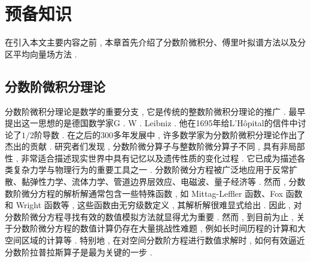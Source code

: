 \chapter[预备知识]{预备知识}

在引入本文主要内容之前 , 本章首先介绍了分数阶微积分、傅里叶拟谱方法以及分区平均向量场方法 . 
\section{分数阶微积分理论}
分数阶微积分理论是数学的重要分支 , 它是传统的整数阶微积分理论的推广 . 最早提出这一思想的是德国数学家G . W . Leibniz . 他在1695年给L'Hôpital的信件中讨论了$1/2$阶导数 . 在之后的300多年发展中 , 许多数学家为分数阶微积分理论作出了杰出的贡献\cite{SunZhiZhongFenShuJieWeiFenFangChengDeYouXianChaiFenFangFa2021} . 
研究者们发现 , 分数阶微分算子与整数阶微分算子不同 , 具有非局部性 , 非常适合描述现实世界中具有记忆以及遗传性质的变化过程 . 它已成为描述各类复杂力学与物理行为的重要工具之一 . 
分数阶微分方程被广泛地应用于反常扩散、黏弹性力学、流体力学、管道边界层效应、电磁波、量子经济等 . 
然而 , 分数数阶微分方程的解析解通常包含一些特殊函数 , 如 Mittag-Leffler 函数、Fox 函数和 Wright 函数等 , 这些函数由无穷级数定义 , 其解析解很难显式给出 . 
因此 , 对分数阶微分方程寻找有效的数值模拟方法就显得尤为重要 . 然而 , 到目前为止 , 关于分数阶微分方程的数值计算仍存在大量挑战性难题 , 例如长时间历程的计算和大空间区域的计算等 . 
特别地 , 在对空间分数阶方程进行数值求解时 , 如何有效逼近分数阶拉普拉斯算子是最为关键的一步 . 
